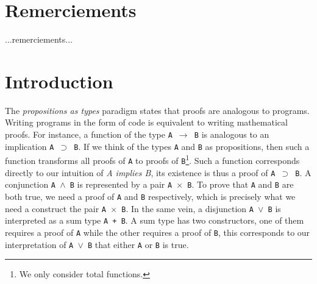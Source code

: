 \documentclass[12pt,twoside,maitrise]{dms}
\theoremstyle{definition}
\numberwithin{equation}{section}
\numberwithin{table}{chapter}
\numberwithin{figure}{chapter}
\newcommand\fn[1] {\texttt{#1}}
\begin{document}

\chapter*{Remerciements}

...remerciements...


\NoChapterPageNumber
\cleardoublepage
{}


\chapter{Introduction}

The \emph{propositions as types} paradigm states that proofs are analogous to
programs. Writing programs in the form of code is equivalent to writing
mathematical proofs. For instance, a function of the type \fn{A $\rightarrow$ B}
is analogous to an implication \fn{A $\supset$ B}. If we think of the types
\fn{A} and \fn{B} as propositions, then such a function transforms all proofs of
\fn{A} to proofs of \fn{B}\footnote{We only consider total functions.}. Such a
function corresponds directly to our intuition of \emph{A implies B}, its
existence is thus a proof of \fn{A $\supset$ B}. A conjunction \fn{A $\wedge$ B}
is represented by a pair \fn{A $\times$ B}. To prove that \fn{A} and
\fn{B} are both true, we need a proof of \fn{A} and \fn{B} respectively, which
is precisely what we need a construct the pair \fn{A $\times$ B}. In the same
vein, a disjunction \fn{A $\vee$ B} is interpreted as a sum type \fn{A + B}. A
sum type has two constructors, one of them requires a proof of \fn{A} while the
other requires a proof of \fn{B}, this corresponds to our interpretation of
\fn{A $\vee$ B} that either \fn{A} or \fn{B} is true.
\end{document}
